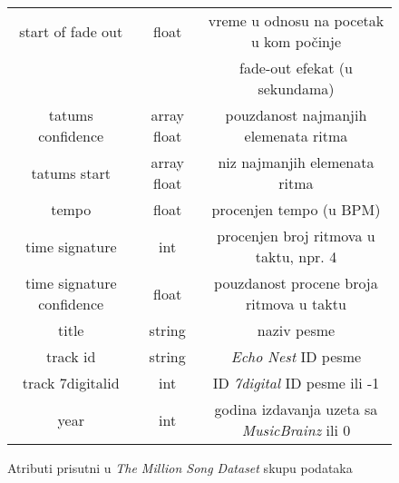 \begin{figure}[H]
\begin{tabular}{|c|c|c|}
        start of fade out & float & vreme u odnosu na pocetak u kom po\v{c}inje \\
        & & fade-out efekat (u sekundama) \\
        tatums confidence & array float & pouzdanost najmanjih elemenata ritma \\
        tatums start & array float & niz najmanjih elemenata ritma \\
        tempo & float & procenjen tempo (u BPM) \\
        time signature & int & procenjen broj ritmova u taktu, npr. 4 \\
        time signature confidence & float & pouzdanost procene broja ritmova u taktu \\
        title & string & naziv pesme \\
        track id & string & \emph{Echo Nest} ID pesme \\
        track 7digitalid & int & ID \emph{7digital} ID pesme ili -1 \\
        year & int & godina izdavanja uzeta sa \emph{MusicBrainz} ili 0 \\
        \hline
    \end{tabular}
    \label{fig:Atributi}
    \caption{Atributi prisutni u \emph{The Million Song Dataset} skupu podataka}
\end{figure}


